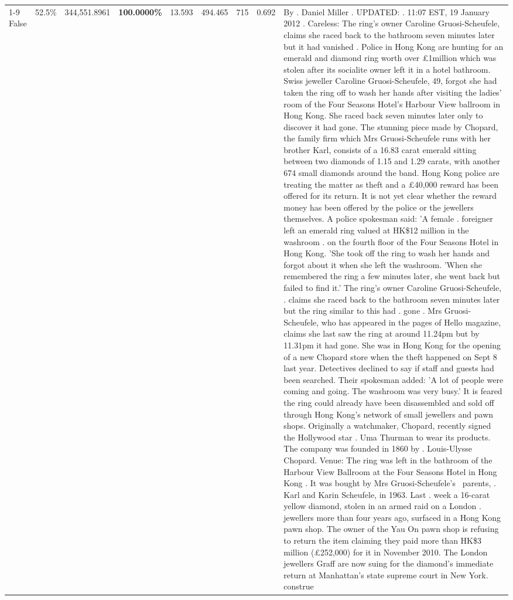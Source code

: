 \begin{table}[H]
\begin{tabular}{lllrlllll}
\cline{1-9}
False & 52.5\% & 344,551.8961 & \bfseries \color{red} 100.0000\% & 13.593 & 494.465 & 715 & 0.692 & By . Daniel Miller . UPDATED: . 11:07 EST, 19 January 2012 . Careless: The ring's owner Caroline Gruosi-Scheufele, claims she raced back to the bathroom seven minutes later but it had vanished . Police in Hong Kong are hunting for an emerald and diamond ring worth over £1million which was stolen after its socialite owner left it in a hotel bathroom. Swiss jeweller Caroline Gruosi-Scheufele, 49, forgot she had taken the ring off to wash her hands after visiting the ladies' room of the Four Seasons Hotel's Harbour View ballroom in Hong Kong. She raced back seven minutes later only to discover it had gone. The stunning piece made by Chopard, the family firm which Mrs Gruosi-Scheufele runs with her brother Karl, consists of a 16.83 carat emerald sitting between two diamonds of 1.15 and 1.29 carats, with another 674 small diamonds around the band. Hong Kong police are treating the matter as theft and a £40,000 reward has been offered for its return. It is not yet clear whether the reward money has been offered by the police or the jewellers themselves. A police spokesman said: 'A female . foreigner left an emerald ring valued at HK\$12 million in the washroom . on the fourth floor of the Four Seasons Hotel in Hong Kong. 'She took off the ring to wash her hands and forgot about it when she left the washroom. 'When she remembered the ring a few minutes later, she went back but failed to find it.' The ring's owner Caroline Gruosi-Scheufele, . claims she raced back to the bathroom seven minutes later but the ring similar to this had . gone . Mrs Gruosi-Scheufele, who has appeared in the pages of Hello magazine, claims she last saw the ring at around 11.24pm but by 11.31pm it had gone. She was in Hong Kong for the opening of a new Chopard store when the theft happened on Sept 8 last year. Detectives declined to say if staff and guests had been searched. Their spokesman added: 'A lot of people were coming and going. The washroom was very busy.' It is feared the ring could already have been disassembled and sold off through Hong Kong's network of small jewellers and pawn shops. Originally a watchmaker, Chopard, recently signed the Hollywood star . Uma Thurman to wear its products. The company was founded in 1860 by . Louis-Ulysse Chopard. Venue: The ring was left in the bathroom of the Harbour View Ballroom at the Four Seasons Hotel in Hong Kong . It was bought by Mrs Gruosi-Scheufele's  parents, . Karl and Karin Scheufele, in 1963. Last . week a 16-carat yellow diamond, stolen in an armed raid on a London . jewellers more than four years ago, surfaced in a Hong Kong pawn shop. The owner of the Yau On pawn shop is refusing to return the item claiming they paid more than HK\$3 million (£252,000) for it in November 2010. The London jewellers Graff are now suing for the diamond’s immediate return at Manhattan’s state supreme court in New York. construe \\

\end{tabular}
\end{table}
